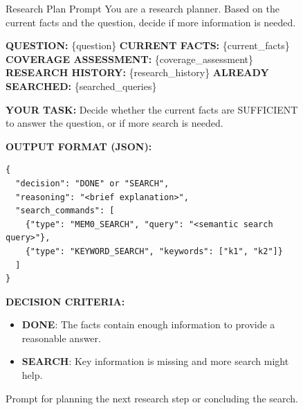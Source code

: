 \documentclass{article}
\theoremstyle{plain}
\theoremstyle{definition}
\theoremstyle{remark}
\begin{document}
\begin{figure}[htb]
\begin{AIbox}[width=\textwidth]{Research Plan Prompt}
\footnotesize
You are a research planner. Based on the current facts and the question, decide if more information is needed.

\textbf{QUESTION:} \{question\} \newline
\textbf{CURRENT FACTS:} \{current\_facts\} \newline
\textbf{COVERAGE ASSESSMENT:} \{coverage\_assessment\} \newline
\textbf{RESEARCH HISTORY:} \{research\_history\} \newline
\textbf{ALREADY SEARCHED:} \{searched\_queries\}

\textbf{YOUR TASK:} \newline
Decide whether the current facts are SUFFICIENT to answer the question, or if more search is needed.

\textbf{OUTPUT FORMAT (JSON):}
\begin{verbatim}
{
  "decision": "DONE" or "SEARCH",
  "reasoning": "<brief explanation>",
  "search_commands": [
    {"type": "MEM0_SEARCH", "query": "<semantic search query>"},
    {"type": "KEYWORD_SEARCH", "keywords": ["k1", "k2"]}
  ]
}
\end{verbatim}

\textbf{DECISION CRITERIA:}
\begin{itemize}
    \item \textbf{DONE}: The facts contain enough information to provide a reasonable answer.
    \item \textbf{SEARCH}: Key information is missing and more search might help.
\end{itemize}
\end{AIbox}
\caption{Prompt for planning the next research step or concluding the search.}
\label{fig:research_plan_prompt}
\end{figure}
\end{document}
